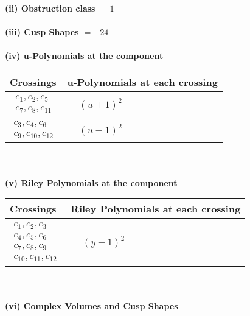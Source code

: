 \documentclass[1p]{elsarticle_modified}
\theoremstyle{definition}
\begin{document}
\flushleft \textbf{(ii) Obstruction class $= 1$}\\~\\
\flushleft \textbf{(iii) Cusp Shapes $= -24$}\\~\\
\newpage\renewcommand{\arraystretch}{1}
\flushleft \textbf{(iv) u-Polynomials at the component}\newline \\
\begin{tabular}{m{50pt}|m{274pt}}
Crossings & \hspace{64pt}u-Polynomials at each crossing \\
\hline $$\begin{aligned}c_{1},c_{2},c_{5}\\c_{7},c_{8},c_{11}\end{aligned}$$&$\begin{aligned}
&(u+1)^2
\end{aligned}$\\
\hline $$\begin{aligned}c_{3},c_{4},c_{6}\\c_{9},c_{10},c_{12}\end{aligned}$$&$\begin{aligned}
&(u-1)^2
\end{aligned}$\\
\hline
\end{tabular}\\~\\
\newpage\renewcommand{\arraystretch}{1}
\flushleft \textbf{(v) Riley Polynomials at the component}\newline \\
\begin{tabular}{m{50pt}|m{274pt}}
Crossings & \hspace{64pt}Riley Polynomials at each crossing \\
\hline $$\begin{aligned}c_{1},c_{2},c_{3}\\c_{4},c_{5},c_{6}\\c_{7},c_{8},c_{9}\\c_{10},c_{11},c_{12}\end{aligned}$$&$\begin{aligned}
&(y-1)^2
\end{aligned}$\\
\hline
\end{tabular}\\~\\
\newpage\flushleft \textbf{(vi) Complex Volumes and Cusp Shapes}
\end{document}
